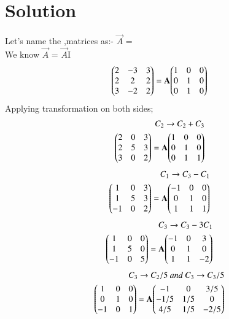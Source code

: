 \documentclass[journal,12pt,twocolumn]{IEEEtran}
\begin{document}
\section{\textbf{Solution}}
Let's name the ,matrices as:-
$\vec{A}$ = \\
We know 
$\vec{A}$ = $\vec{A}$I\\
\begin{align}
{\ensuremath{\begin{pmatrix}2 & -3 & 3\\ 2 & 2 & 2\\ 3 & -2 & 2\end{pmatrix}}} =\mathbf{A}
{\begin{pmatrix}1 & 0 & 0\\0 & 1 & 0\\0 & 1 & 0\end{pmatrix}}
\end{align}
%
Applying transformation on both sides;
\begin{align}
\ {C_2\rightarrow C_2+ C_3 } \\
{\begin{pmatrix}2 & 0 & 3\\ 2 & 5 & 3\\ 3 & 0 & 2\end{pmatrix}} =\mathbf{A} {\begin{pmatrix}1 & 0 & 0\\0 & 1 & 0\\0 & 1 & 1\end{pmatrix}}
\end{align}
\begin{align}
\ {C_1\rightarrow C_3- C_1 } \\ 
{\begin{pmatrix}1 & 0 & 3\\ 1 & 5 & 3\\ -1 & 0 & 2\end{pmatrix}} =\mathbf{A} {\begin{pmatrix}-1 & 0 & 0\\0 & 1 & 0\\1 & 1 & 1\end{pmatrix}}
\end{align}
\begin{align}
\ {C_3\rightarrow C_3- 3C_1 }\\
{\begin{pmatrix}1 & 0 & 0\\ 1 & 5 & 0\\ -1 & 0 & 5\end{pmatrix}} =\mathbf{A} {\begin{pmatrix}-1 & 0 & 3\\0 & 1 & 0\\1 & 1 & -2\end{pmatrix}}
\end{align}
\begin{align}
\ {C_3\rightarrow C_2/5} 
\ and 
\ {C_3\rightarrow C_3/5}\\
{\begin{pmatrix}1 & 0 & 0\\ 0 & 1 & 0\\ -1 & 0 & 1\end{pmatrix}} =\mathbf{A} {\begin{pmatrix}-1 & 0 & 3/5\\-1/5 & 1/5 & 0\\4/5 & 1/5 & -2/5\end{pmatrix}}
\end{align}
\end{document}
